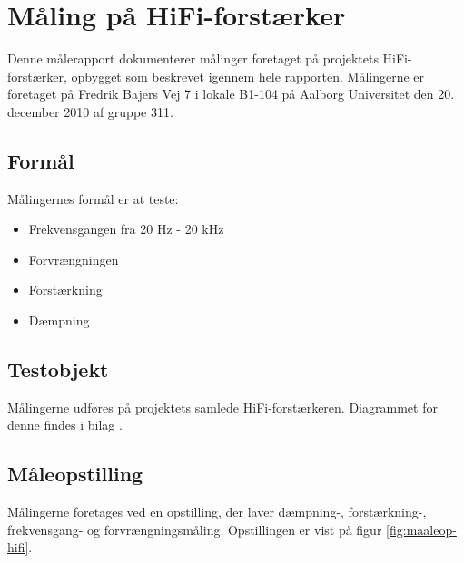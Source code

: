 \chapter{Måling på HiFi-forstærker}
\label{maaling_hifi}
Denne målerapport dokumenterer målinger foretaget på projektets HiFi-forstærker, opbygget som beskrevet igennem hele rapporten. Målingerne er foretaget på Fredrik Bajers Vej 7 i lokale B1-104 på Aalborg Universitet den 20. december 2010 af gruppe 311.

\section*{Formål}
Målingernes formål er at teste:

\begin{itemize}
\item Frekvensgangen fra 20 Hz - 20 kHz
\item Forvrængningen
\item Forstærkning
\item Dæmpning
\end{itemize}

\section*{Testobjekt}
Målingerne udføres på projektets samlede HiFi-forstærkeren. Diagrammet for denne findes i bilag \cite{hifi-forstaerker-diagram}.%

\section*{Måleopstilling}
Målingerne foretages   ved en opstilling, der laver dæmpning-, forstærkning-, frekvensgang- og forvrængningsmåling. Opstillingen er vist på figur \ref{fig:maaleop-hifi}.\\\\\\\\\\

